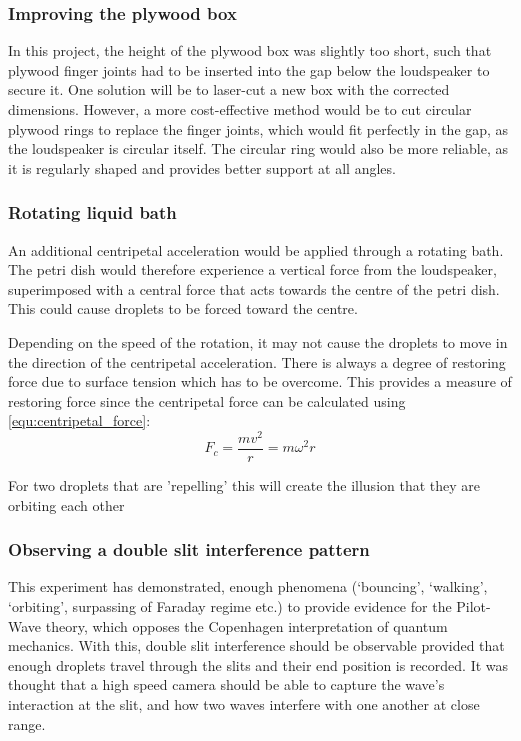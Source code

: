 \subsubsection{Improving the plywood box}
In this project, the height of the plywood box was slightly too short, such that plywood finger joints had to be inserted into the gap below the loudspeaker to secure it. One solution will be to laser-cut a new box with the corrected dimensions. However, a more cost-effective method would be to cut circular plywood rings to replace the finger joints, which would fit perfectly in the gap, as the loudspeaker is circular itself. The circular ring would also be more reliable, as it is regularly shaped and provides better support at all angles.

\subsubsection{Rotating liquid bath}
An additional centripetal acceleration would be applied through a rotating bath. The petri dish would therefore experience a vertical force from the loudspeaker, superimposed with a central force that acts towards the centre of the petri dish. This could cause droplets to be forced toward the centre.

Depending on the speed of the rotation, it may not cause the droplets to move in the direction of the centripetal acceleration. There is always a degree of restoring force due to surface tension which has to be overcome. This provides a measure of restoring force since the centripetal force can be calculated using \ref{equ:centripetal_force}:
\begin{equation}
F_c = \frac{mv^2}{r} = m \omega^2 r 
\label{equ:centripetal_force}
\end{equation}

For two droplets that are 'repelling' this will create the illusion that they are orbiting each other

\subsubsection{Observing a double slit interference pattern}
This experiment has demonstrated, enough phenomena (`bouncing', `walking', `orbiting', surpassing of Faraday regime etc.) to provide evidence for the Pilot-Wave theory, which opposes the Copenhagen interpretation of quantum mechanics. With this, double slit interference should be observable provided that enough droplets travel through the slits and their end position is recorded. It was thought that a high speed camera should be able to capture the wave's interaction at the slit, and how two waves interfere with one another at close range.

